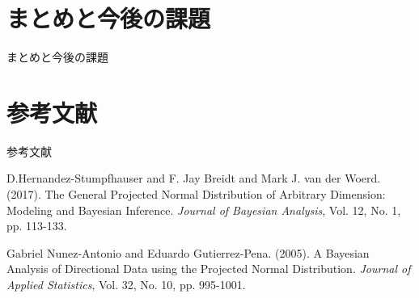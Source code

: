 \documentclass[dvipdfmx]{beamer}
\begin{document}
\section{まとめと今後の課題}
\begin{frame}{まとめと今後の課題}

\end{frame}

\section{参考文献}
\begin{frame}[allowframebreaks]{参考文献}

{\scriptsize
\begin{thebibliography}{99}
\setlength{\itemsep}{-.5zw}
\beamertemplatetextbibitems %

D.Hernandez-Stumpfhauser and F. Jay Breidt and Mark J. van der Woerd. (2017). The General Projected Normal Distribution of Arbitrary Dimension: Modeling and Bayesian Inference. {\it Journal of Bayesian Analysis}, Vol. 12, No. 1, pp. 113-133.

Gabriel Nunez-Antonio and Eduardo Gutierrez-Pena. (2005). A Bayesian Analysis of Directional Data using the Projected Normal Distribution. {\it Journal of Applied Statistics}, Vol. 32, No. 10, pp. 995-1001.

\end{thebibliography}
}

\end{frame}
\end{document}
